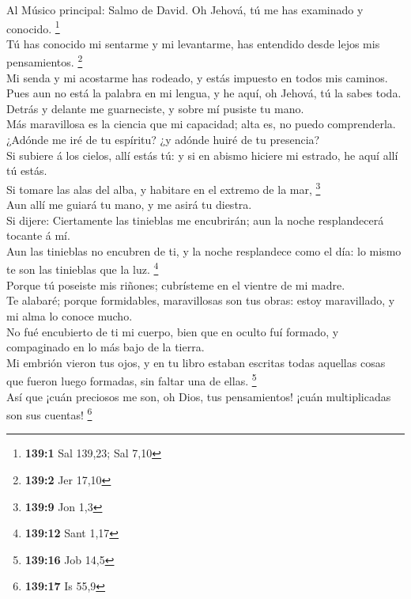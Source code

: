  Al Músico principal: Salmo de David. Oh Jehová, tú me has
examinado y conocido. \footnote{\textbf{139:1} Sal 139,23; Sal 7,10}\\
 Tú has conocido mi sentarme y mi levantarme, has
entendido desde lejos mis pensamientos. \footnote{\textbf{139:2} Jer
  17,10}\\
 Mi senda y mi acostarme has rodeado, y estás impuesto en
todos mis caminos.\\
 Pues aun no está la palabra en mi lengua, y he aquí, oh
Jehová, tú la sabes toda.\\
 Detrás y delante me guarneciste, y sobre mí pusiste tu
mano.\\
 Más maravillosa es la ciencia que mi capacidad; alta es,
no puedo comprenderla.\\
 ¿Adónde me iré de tu espíritu? ¿y adónde huiré de tu
presencia?\\
 Si subiere á los cielos, allí estás tú: y si en abismo
hiciere mi estrado, he aquí allí tú estás.\\
 Si tomare las alas del alba, y habitare en el extremo de
la mar, \footnote{\textbf{139:9} Jon 1,3}\\
 Aun allí me guiará tu mano, y me asirá tu diestra.\\
 Si dijere: Ciertamente las tinieblas me encubrirán; aun
la noche resplandecerá tocante á mí.\\
 Aun las tinieblas no encubren de ti, y la noche
resplandece como el día: lo mismo te son las tinieblas que la luz.
\footnote{\textbf{139:12} Sant 1,17}\\
 Porque tú poseiste mis riñones; cubrísteme en el vientre
de mi madre.\\
 Te alabaré; porque formidables, maravillosas son tus
obras: estoy maravillado, y mi alma lo conoce mucho.\\
 No fué encubierto de ti mi cuerpo, bien que en oculto
fuí formado, y compaginado en lo más bajo de la tierra.\\
 Mi embrión vieron tus ojos, y en tu libro estaban
escritas todas aquellas cosas que fueron luego formadas, sin faltar una
de ellas. \footnote{\textbf{139:16} Job 14,5}\\
 Así que ¡cuán preciosos me son, oh Dios, tus
pensamientos! ¡cuán multiplicadas son sus cuentas! \footnote{\textbf{139:17}
  Is 55,9}\\
